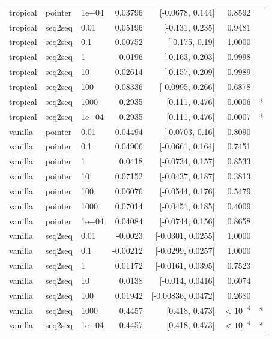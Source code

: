 \documentclass[10pt]{article}
\begin{document}
{\begin{longtable}{lllrrrl}
tropical & pointer & 1e+04 & 0.03796 & [-0.0678, 0.144] & 0.8592 & \\
tropical & seq2seq & 0.01 & 0.05196 & [-0.131, 0.235] & 0.9481 & \\
tropical & seq2seq & 0.1 & 0.00752 & [-0.175, 0.19] & 1.0000 & \\
tropical & seq2seq & 1 & 0.0196 & [-0.163, 0.203] & 0.9998 & \\
tropical & seq2seq & 10 & 0.02614 & [-0.157, 0.209] & 0.9989 & \\
tropical & seq2seq & 100 & 0.08336 & [-0.0995, 0.266] & 0.6878 & \\
tropical & seq2seq & 1000 & 0.2935 & [0.111, 0.476] & 0.0006 & *\\
tropical & seq2seq & 1e+04 & 0.2935 & [0.111, 0.476] & 0.0007 & *\\
vanilla & pointer & 0.01 & 0.04494 & [-0.0703, 0.16] & 0.8090 & \\
vanilla & pointer & 0.1 & 0.04906 & [-0.0661, 0.164] & 0.7451 & \\
vanilla & pointer & 1 & 0.0418 & [-0.0734, 0.157] & 0.8533 & \\
vanilla & pointer & 10 & 0.07152 & [-0.0437, 0.187] & 0.3813 & \\
vanilla & pointer & 100 & 0.06076 & [-0.0544, 0.176] & 0.5479 & \\
vanilla & pointer & 1000 & 0.07014 & [-0.0451, 0.185] & 0.4009 & \\
vanilla & pointer & 1e+04 & 0.04084 & [-0.0744, 0.156] & 0.8658 & \\
vanilla & seq2seq & 0.01 & -0.0023 & [-0.0301, 0.0255] & 1.0000 & \\
vanilla & seq2seq & 0.1 & -0.00212 & [-0.0299, 0.0257] & 1.0000 & \\
vanilla & seq2seq & 1 & 0.01172 & [-0.0161, 0.0395] & 0.7523 & \\
vanilla & seq2seq & 10 & 0.0138 & [-0.014, 0.0416] & 0.6074 & \\
vanilla & seq2seq & 100 & 0.01942 & [-0.00836, 0.0472] & 0.2680 & \\
vanilla & seq2seq & 1000 & 0.4457 & [0.418, 0.473] & $<10^{-4}$ & *\\
vanilla & seq2seq & 1e+04 & 0.4457 & [0.418, 0.473] & $<10^{-4}$ & *\\
\bottomrule
\end{longtable}
}
\end{document}
